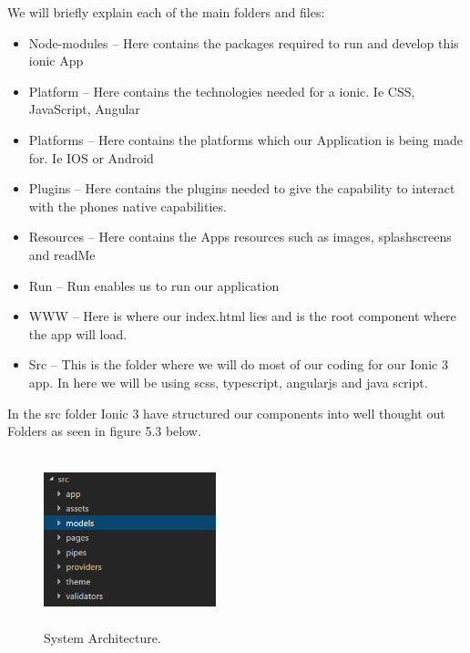 \noindent We will briefly explain each of the main folders and files:

\begin{itemize}
\item Node-modules – Here contains the packages required to run and develop this ionic App
\item Platform – Here contains the technologies needed for a ionic. Ie CSS, JavaScript, Angular
\item Platforms – Here contains the platforms which our Application is being made for. Ie IOS or Android
\item Plugins – Here contains the plugins needed to give the capability to interact with the phones native capabilities.
\item Resources – Here contains the Apps resources such as images, splashscreens and readMe
\item Run – Run enables us to run our application
\item WWW – Here is where our index.html lies and is the root component where the app will load. 
\item Src – This is the folder where we will do most of our coding for our Ionic 3 app. In here we will be using scss, typescript, angularjs and java script.
\end{itemize}

\noindent In the src folder Ionic 3 have structured our components into well thought out Folders as seen in figure 5.3 below.

\begin{figure}[h]
\centering
\includegraphics[width=5cm, height=5cm]{img/srcStructure}
\caption{System Architecture.}
\end{figure}

